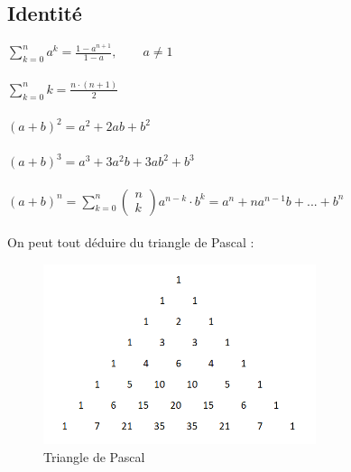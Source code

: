 \documentclass{article}
\begin{document}
\subsection{Identité}
\(\sum_{k=0}^{n} a^k = \frac{1-a^{n+1}}{1-a}, \qquad a \neq 1\)\\\\
\( \sum_{k=0}^{n} k = \frac{n\cdot(n+1)}{2} \)\\\\
\( (a + b)^2 = a^2 + 2ab + b^2  \)\\\\
\( (a + b)^3 = a^3 + 3a^2b + 3ab^2 + b^3 \)\\\\
\( (a + b)^n = \sum_{k=0}^{n} 
\begin{pmatrix}
    n \\ k
\end{pmatrix} a^{n-k}\cdot b^k = a^n + na^{n-1}b + ... + b^n \)\\\\
On peut tout déduire du triangle de Pascal :
\begin{figure}[htp]
    \centering
    \includegraphics[width=8cm]{Images/Pascal-Triangle.png}
    \caption{Triangle de Pascal}
\end{figure}
\end{document}
